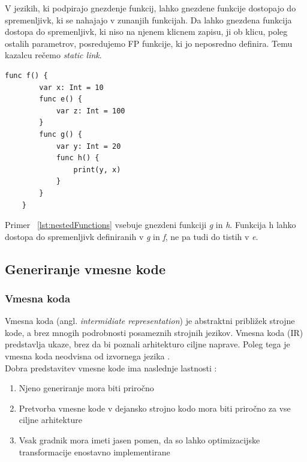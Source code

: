 \documentclass[a4paper, 12p]{book}
\begin{document}
V jezikih, ki podpirajo gnezdenje funkcij, lahko gnezdene funkcije dostopajo do spremenljivk, ki se nahajajo v zunanjih funkcijah. Da lahko gnezdena funkcija dostopa do spremenljivk, ki niso na njenem klicnem zapisu, ji ob klicu, poleg ostalih parametrov, posredujemo FP funkcije, ki jo neposredno definira. Temu kazalcu rečemo \textit{static link}. 

\renewcommand{\lstlistingname}{Program}
\begin{lstlisting}[caption={Primer gnezdenih funkcij}, captionpos=b, label={lst:nestedFunctions}]
    func f() {
        var x: Int = 10
        func e() {
            var z: Int = 100
        }
        func g() {
            var y: Int = 20
            func h() {
                print(y, x)
            }
        }
    }
\end{lstlisting}

Primer ~\ref{lst:nestedFunctions} vsebuje gnezdeni funkciji \textit{g} in \textit{h}. Funkcija h lahko dostopa do spremenljivk definiranih v \textit{g} in \textit{f}, ne pa tudi do tistih v \textit{e}.

\subsection{Generiranje vmesne kode}   

\subsubsection{Vmesna koda}

Vmesna koda (angl. \textit{intermidiate representation}) je abstraktni približek strojne kode, a brez mnogih podrobnosti posameznih strojnih jezikov. Vmesna koda (IR) predstavlja ukaze, brez da bi poznali arhitekturo ciljne naprave. Poleg tega je vmesna koda neodvisna od izvornega jezika \cite{modernCompiler}. \\
\indent Dobra predstavitev vmesne kode ima naslednje lastnosti \cite{modernCompiler}:

\begin{enumerate}
	\item Njeno generiranje mora biti priročno
	\item Pretvorba vmesne kode v dejansko strojno kodo mora biti priročno za vse ciljne arhitekture
	\item Vsak gradnik mora imeti jasen pomen, da so lahko optimizacijske transformacije enostavno implementirane
\end{enumerate}
\end{document}
